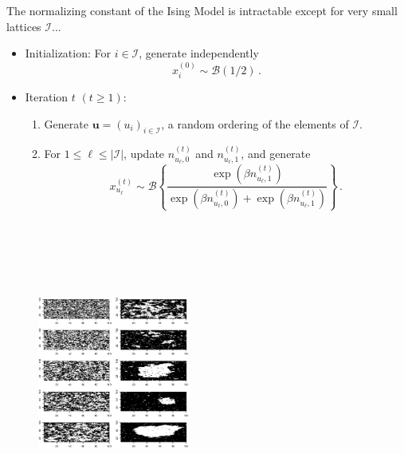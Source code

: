 \begin{slide}
\end{slide}\begin{slide}

The normalizing constant of the Ising Model is intractable except for very small lattices $\mathcal{I}$...

\vs \pause {}

\end{slide}\begin{slide}

\begin{algo}
\begin{itemize}
\item[ ]Initialization: For $i\in\mathcal{I}$, generate independently
$$
x_i^{(0)}\sim\mathscr{B}(1/2)\,.
$$
\item[ ] Iteration $t$ $(t\ge 1)$:
\begin{enumerate}
\item Generate $\mathbf{u}=(u_i)_{i\in\mathcal{I}}$, a random ordering of the elements of $\mathcal{I}$.
\item For $1\le \ell\le |\mathcal{I}|$, update $n_{u_\ell,0}^{(t)}$ and $n_{u_\ell,1}^{(t)}$, and generate
$$
x_{u_\ell}^{(t)}\sim\mathscr{B}\left\{\frac{\exp(\beta n_{u_\ell,1}^{(t)})}
{\exp(\beta n_{u_\ell,0}^{(t)})+\exp(\beta n_{u_\ell,1}^{(t)})}\right\}\,.
$$
\end{enumerate}
\end{itemize}
\end{algo}

\end{slide}\begin{slide}

\begin{figure}
\begin{center}
\includegraphics[width=5cm,height=10cm,angle=270]{figures/gising.eps}
\end{center}
\end{figure}


\end{slide}
